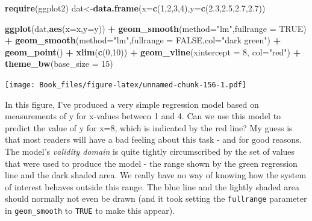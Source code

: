 \documentclass[
]{book}
\newenvironment{Shaded}{\begin{snugshade}}{\end{snugshade}}
\newcommand{\DataTypeTok}[1]{\textcolor[rgb]{0.13,0.29,0.53}{#1}}
\newcommand{\DecValTok}[1]{\textcolor[rgb]{0.00,0.00,0.81}{#1}}
\newcommand{\FloatTok}[1]{\textcolor[rgb]{0.00,0.00,0.81}{#1}}
\newcommand{\KeywordTok}[1]{\textcolor[rgb]{0.13,0.29,0.53}{\textbf{#1}}}
\newcommand{\NormalTok}[1]{#1}
\newcommand{\OperatorTok}[1]{\textcolor[rgb]{0.81,0.36,0.00}{\textbf{#1}}}
\newcommand{\OtherTok}[1]{\textcolor[rgb]{0.56,0.35,0.01}{#1}}
\newcommand{\StringTok}[1]{\textcolor[rgb]{0.31,0.60,0.02}{#1}}
\begin{document}
\begin{Shaded}
\begin{Highlighting}[]
\KeywordTok{require}\NormalTok{(ggplot2)}
\NormalTok{dat<-}\KeywordTok{data.frame}\NormalTok{(}\DataTypeTok{x=}\KeywordTok{c}\NormalTok{(}\DecValTok{1}\NormalTok{,}\DecValTok{2}\NormalTok{,}\DecValTok{3}\NormalTok{,}\DecValTok{4}\NormalTok{),}\DataTypeTok{y=}\KeywordTok{c}\NormalTok{(}\FloatTok{2.3}\NormalTok{,}\FloatTok{2.5}\NormalTok{,}\FloatTok{2.7}\NormalTok{,}\FloatTok{2.7}\NormalTok{))}

\KeywordTok{ggplot}\NormalTok{(dat,}\KeywordTok{aes}\NormalTok{(}\DataTypeTok{x=}\NormalTok{x,}\DataTypeTok{y=}\NormalTok{y)) }\OperatorTok{+}
\StringTok{  }\KeywordTok{geom_smooth}\NormalTok{(}\DataTypeTok{method=}\StringTok{"lm"}\NormalTok{,}\DataTypeTok{fullrange =} \OtherTok{TRUE}\NormalTok{) }\OperatorTok{+}
\StringTok{  }\KeywordTok{geom_smooth}\NormalTok{(}\DataTypeTok{method=}\StringTok{"lm"}\NormalTok{,}\DataTypeTok{fullrange =} \OtherTok{FALSE}\NormalTok{,}\DataTypeTok{col=}\StringTok{"dark green"}\NormalTok{) }\OperatorTok{+}
\StringTok{  }\KeywordTok{geom_point}\NormalTok{() }\OperatorTok{+}
\StringTok{  }\KeywordTok{xlim}\NormalTok{(}\KeywordTok{c}\NormalTok{(}\DecValTok{0}\NormalTok{,}\DecValTok{10}\NormalTok{)) }\OperatorTok{+}
\StringTok{  }\KeywordTok{geom_vline}\NormalTok{(}\DataTypeTok{xintercept =} \DecValTok{8}\NormalTok{, }\DataTypeTok{col=}\StringTok{"red"}\NormalTok{) }\OperatorTok{+}
\StringTok{  }\KeywordTok{theme_bw}\NormalTok{(}\DataTypeTok{base_size =} \DecValTok{15}\NormalTok{)}
\end{Highlighting}
\end{Shaded}

\texttt{[image: Book\_files/figure-latex/unnamed-chunk-156-1.pdf]}

In this figure, I've produced a very simple regression model based on measurements of y for x-values between 1 and 4. Can we use this model to predict the value of y for x=8, which is indicated by the red line? My guess is that most readers will have a bad feeling about this task - and for good reasons. The model's \emph{validity domain} is quite tightly circumscribed by the set of values that were used to produce the model - the range shown by the green regression line and the dark shaded area. We really have no way of knowing how the system of interest behaves outside this range. The blue line and the lightly shaded area should normally not even be drawn (and it took setting the \texttt{fullrange} parameter in \texttt{geom\_smooth} to \texttt{TRUE} to make this appear).
\end{document}

